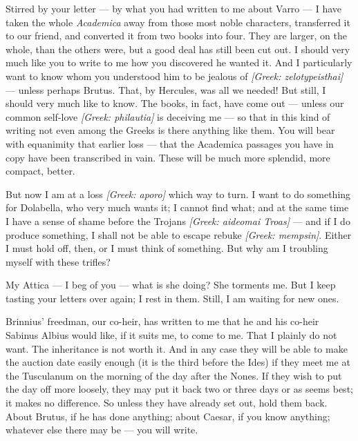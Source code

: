 

 Stirred by your letter --- by what you had written to me about Varro --- I have taken the whole \textit{Academica} away from those most noble characters, transferred it to our friend, and converted it from two books into four. They are larger, on the whole, than the others were, but a good deal has still been cut out. I should very much like you to write to me how you discovered he wanted it. And I particularly want to know whom you understood him to be jealous of \textit{[Greek: zelotypeisthai]} --- unless perhaps Brutus. That, by Hercules, was all we needed! But still, I should very much like to know. The books, in fact, have come out --- unless our common self-love \textit{[Greek: philautia]} is deceiving me --- so that in this kind of writing not even among the Greeks is there anything like them. You will bear with equanimity that earlier loss --- that the Academica passages you have in copy have been transcribed in vain. These will be much more splendid, more compact, better.

 But now I am at a loss \textit{[Greek: aporo]} which way to turn. I want to do something for Dolabella, who very much wants it; I cannot find what; and at the same time I have a sense of shame before the Trojans \textit{[Greek: aideomai Troas]} --- and if I do produce something, I shall not be able to escape rebuke \textit{[Greek: mempsin]}. Either I must hold off, then, or I must think of something. But why am I troubling myself with these trifles?

 My Attica --- I beg of you --- what is she doing? She torments me. But I keep tasting your letters over again; I rest in them. Still, I am waiting for new ones.

 Brinnius' freedman, our co-heir, has written to me that he and his co-heir Sabinus Albius would like, if it suits me, to come to me. That I plainly do not want. The inheritance is not worth it. And in any case they will be able to make the auction date easily enough (it is the third before the Ides) if they meet me at the Tusculanum on the morning of the day after the Nones. If they wish to put the day off more loosely, they may put it back two or three days or as seems best; it makes no difference. So unless they have already set out, hold them back. About Brutus, if he has done anything; about Caesar, if you know anything; whatever else there may be --- you will write.
